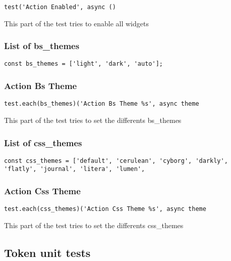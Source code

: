 \documentclass[a4paper]{article}
\begin{document}
\begin{lstlisting}
test('Action Enabled', async ()
\end{lstlisting}

This part of the test tries to enable all widgets

\hypertarget{toc709}{}
\subsubsection{List of bs\_themes}

\begin{lstlisting}
const bs_themes = ['light', 'dark', 'auto'];
\end{lstlisting}

\hypertarget{toc710}{}
\subsubsection{Action Bs Theme}

\begin{lstlisting}
test.each(bs_themes)('Action Bs Theme %s', async theme
\end{lstlisting}

This part of the test tries to set the differents bs\_themes

\hypertarget{toc711}{}
\subsubsection{List of css\_themes}

\begin{lstlisting}
const css_themes = ['default', 'cerulean', 'cyborg', 'darkly', 'flatly', 'journal', 'litera', 'lumen',
\end{lstlisting}

\hypertarget{toc712}{}
\subsubsection{Action Css Theme}

\begin{lstlisting}
test.each(css_themes)('Action Css Theme %s', async theme
\end{lstlisting}

This part of the test tries to set the differents css\_themes

\hypertarget{toc713}{}
\subsection{Token unit tests}
\end{document}
